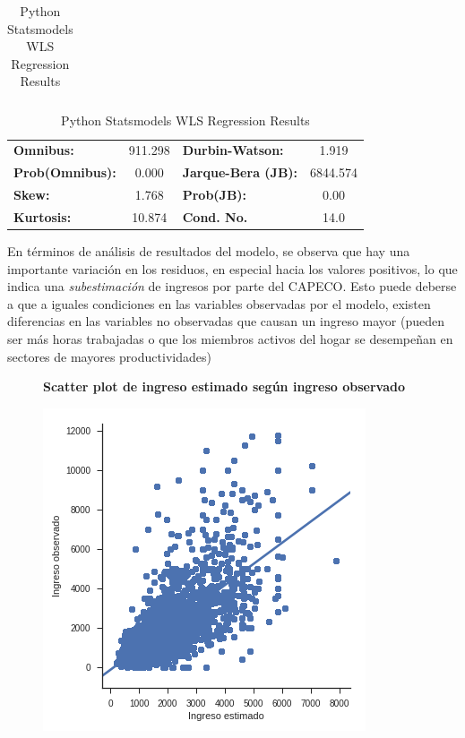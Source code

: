 \begin{table}
\begin{tabular}{lccccc}
	\end{tabular}
	\begin{tabular}{lclc}
		\textbf{Omnibus:}       & 911.298 & \textbf{  Durbin-Watson:     } &    1.919  \\
		\textbf{Prob(Omnibus):} &   0.000 & \textbf{  Jarque-Bera (JB):  } & 6844.574  \\
		\textbf{Skew:}          &   1.768 & \textbf{  Prob(JB):          } &     0.00  \\
		\textbf{Kurtosis:}      &  10.874 & \textbf{  Cond. No.          } &     14.0  \\
		
	\end{tabular}
	\caption{Python Statsmodels WLS Regression Results}
	\label{tab:capecoVipcfSinOut}
\end{table}

En términos de análisis de resultados del modelo, se observa que hay una importante variación en los residuos, en especial hacia los valores positivos, lo que indica una \textit{subestimación} de ingresos por parte del CAPECO. Esto puede deberse a que a iguales condiciones en las variables observadas por el modelo, existen diferencias en las variables no observadas que causan un ingreso mayor (pueden ser más horas trabajadas o que los miembros activos del hogar se desempeñan en sectores de mayores productividades) 


     \begin{figure}[!htb]
     	\centering
     	\textbf{Scatter plot de ingreso estimado según ingreso observado}\par\medskip
     	\includegraphics[scale = 0.4]{../img/capitulo3/evalCapecoVipcf1.png}
     	\caption{}
     	\label{fig:evalCapecoVipcf1.png}
     \end{figure}
     
